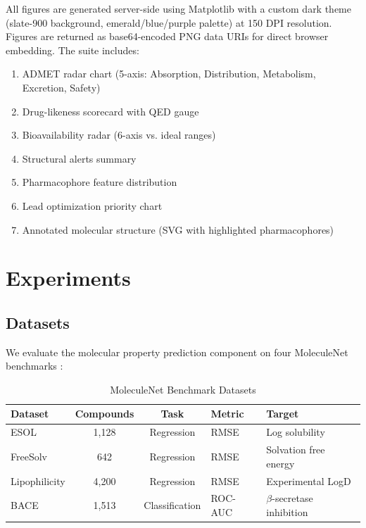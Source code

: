 \documentclass[conference]{IEEEtran}
\begin{document}
All figures are generated server-side using Matplotlib with a custom dark theme (slate-900 background, emerald/blue/purple palette) at 150 DPI resolution. Figures are returned as base64-encoded PNG data URIs for direct browser embedding. The suite includes:

\begin{enumerate}
    \item ADMET radar chart (5-axis: Absorption, Distribution, Metabolism, Excretion, Safety)
    \item Drug-likeness scorecard with QED gauge
    \item Bioavailability radar (6-axis vs. ideal ranges)
    \item Structural alerts summary
    \item Pharmacophore feature distribution
    \item Lead optimization priority chart
    \item Annotated molecular structure (SVG with highlighted pharmacophores)
\end{enumerate}

\section{Experiments}
\label{sec:experiments}

\subsection{Datasets}

We evaluate the molecular property prediction component on four MoleculeNet benchmarks \cite{wu2018moleculenet}:

\begin{table}[h]
\centering
\caption{MoleculeNet Benchmark Datasets}
\label{tab:datasets}
\begin{tabular}{@{}lccll@{}}
\toprule
\textbf{Dataset} & \textbf{Compounds} & \textbf{Task} & \textbf{Metric} & \textbf{Target} \\
\midrule
ESOL      & 1,128 & Regression & RMSE & Log solubility \\
FreeSolv  & 642   & Regression & RMSE & Solvation free energy \\
Lipophilicity & 4,200 & Regression & RMSE & Experimental LogD \\
BACE      & 1,513 & Classification & ROC-AUC & $\beta$-secretase inhibition \\
\bottomrule
\end{tabular}
\end{table}
\end{document}
